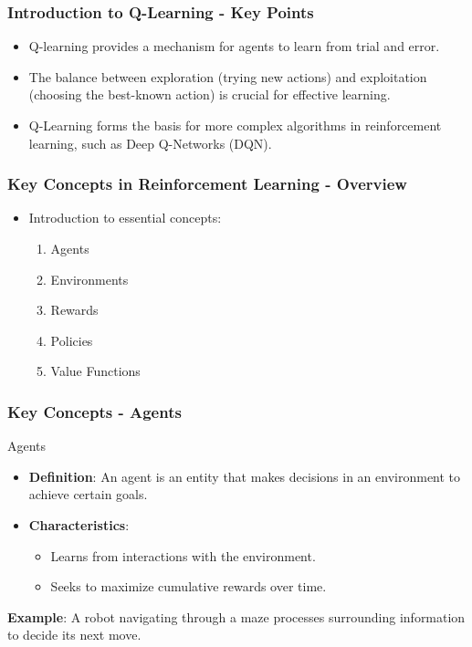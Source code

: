 \documentclass{beamer}
\begin{document}
\begin{frame}[fragile]
    \frametitle{Introduction to Q-Learning - Key Points}
    \begin{itemize}
        \item Q-learning provides a mechanism for agents to learn from trial and error.
        \item The balance between exploration (trying new actions) and exploitation (choosing the best-known action) is crucial for effective learning.
        \item Q-Learning forms the basis for more complex algorithms in reinforcement learning, such as Deep Q-Networks (DQN).
    \end{itemize}
\end{frame}

\begin{frame}
    \titlepage
\end{frame}

\begin{frame}[fragile]
    \frametitle{Key Concepts in Reinforcement Learning - Overview}
    \begin{itemize}
        \item Introduction to essential concepts: 
        \begin{enumerate}
            \item Agents
            \item Environments
            \item Rewards
            \item Policies
            \item Value Functions
        \end{enumerate}
    \end{itemize}
\end{frame}

\begin{frame}[fragile]
    \frametitle{Key Concepts - Agents}
    \begin{block}{Agents}
        \begin{itemize}
            \item \textbf{Definition}: An agent is an entity that makes decisions in an environment to achieve certain goals.
            \item \textbf{Characteristics}: 
                \begin{itemize}
                    \item Learns from interactions with the environment.
                    \item Seeks to maximize cumulative rewards over time.
                \end{itemize}
        \end{itemize}
    \end{block}
    \textbf{Example}: A robot navigating through a maze processes surrounding information to decide its next move.
\end{frame}
\end{document}
